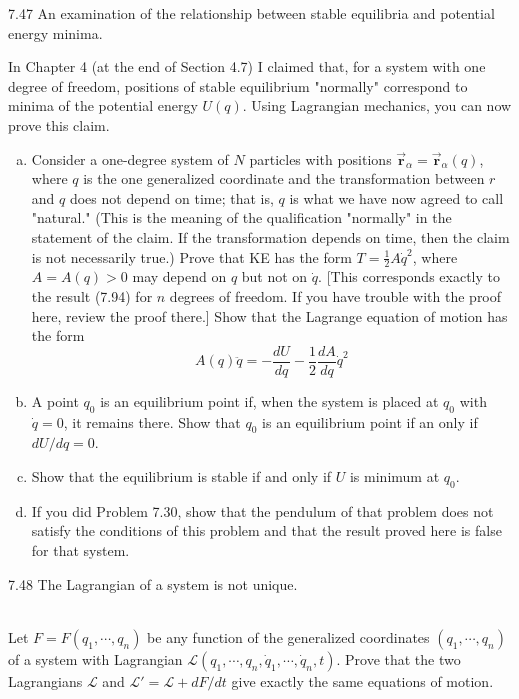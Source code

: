 \documentclass[11pt,letterpaper,boxed]{../hmcpsetrhino}
\newcommand{\half}{\frac{1}{2}}
\let\oldvec\vec
\renewcommand{\vec}[1]{\oldvec{\mathbf{#1}}}
\def\Lagr{\mathcal{L}}
\begin{document}
\begin{problem}[ii]
7.47 An examination of the relationship between stable equilibria and potential energy minima.

\begin{problem}[7.47]
In Chapter 4 (at the end of Section 4.7) I claimed that, for a system with one degree of freedom, positions of stable equilibrium "normally" correspond to minima of the potential energy $U(q)$. Using Lagrangian mechanics, you can now prove this claim. 
\begin{enumerate}[(a)]
\item Consider a one-degree system of $N$ particles with positions $\vec{ r}_\alpha = \vec r_\alpha(q)$, where $q$ is the one generalized coordinate and the transformation between $r$ and $q$ does not depend on time; that is, $q$ is what we have now agreed to call "natural." (This is the meaning of the qualification "normally" in the statement of the claim. If the transformation depends on time, then the claim is not necessarily true.) Prove that KE has the form $T = \half A \dot q^2$, where $A = A(q) > 0$ may depend on $q$ but not on $\dot q$. [This corresponds exactly to the result (7.94) for $n$ degrees of freedom. If you have trouble with the proof here, review the proof there.] Show that the Lagrange equation of motion has the form 
\[	A(q) \ddot q = -\frac{d U}{d q} - \half \frac{d A}{d q} \dot q ^2 \]
\item A point $q_0$ is an equilibrium point if, when the system is placed at $q_0$ with $\dot q = 0$, it remains there. Show that $q_0$ is an equilibrium point if an only if $dU/dq = 0$. 
\item Show that the equilibrium is stable if and only if $U$ is minimum at $q_0$. 
\item If you did Problem 7.30, show that the pendulum of that problem does not satisfy the conditions of this problem and that the result proved here is false for that system.
\end{enumerate}
\end{problem}
\end{problem}

\begin{solution}

\vfill
\end{solution}


\newpage

\begin{problem}[iii]
7.48 The Lagrangian of a system is not unique.\\
\hfill\\
\begin{problem}[7.48]
Let $F = F(q_1, \cdots , q_n)$ be any function of the generalized coordinates $(q_1, \cdots, q_n)$ of a system with Lagrangian $\Lagr(q_1, \cdots, q_n, \dot q_1, \cdots, \dot q_n, t)$. Prove that the two Lagrangians $\Lagr$ and $\Lagr' = \Lagr+ d F/ dt$ give exactly the same equations of motion.
\end{problem}
\vspace{-0.45cm}
\end{problem}
\end{document}
